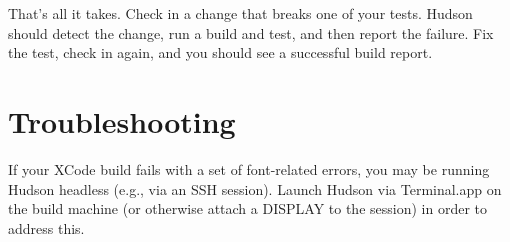 \-That's all it takes. \-Check in a change that breaks one of your tests. \-Hudson should detect the change, run a build and test, and then report the failure. \-Fix the test, check in again, and you should see a successful build report.\hypertarget{_hudson_Troubleshooting}{}\section{\-Troubleshooting}\label{_hudson_Troubleshooting}
\-If your \-X\-Code build fails with a set of font-\/related errors, you may be running \-Hudson headless (e.\-g., via an \-S\-S\-H session). \-Launch \-Hudson via \-Terminal.\-app on the build machine (or otherwise attach a \-D\-I\-S\-P\-L\-A\-Y to the session) in order to address this. 